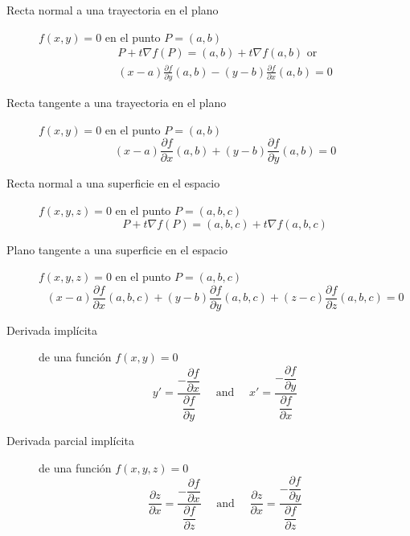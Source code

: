\begin{multicols}{2}
	\begin{tcolorbox}[hbox, title=Rectas tangente y normal en el plano]
		\begin{minipage}{0.4\textwidth}
			\flushleft
			\begin{description}
				\item[Recta normal a una trayectoria en el plano] $f(x,y)=0$ en el punto $P=(a,b)$
				\[
					\begin{array}{c}
						P+t\nabla f(P) = (a,b)+t\nabla f(a,b) \mbox{ or } \\
						(x-a)\frac{\partial f}{\partial y}(a,b)-(y-b)\frac{\partial f}{\partial x}(a,b)=0
					\end{array}      
				\]
				\item[Recta tangente a una trayectoria en el plano] $f(x,y)=0$ en el punto $P=(a,b)$
				\[
					(x-a)\frac{\partial f}{\partial x}(a,b)+(y-b)\frac{\partial f}{\partial y}(a,b)=0
				\]
			\end{description}
		\end{minipage}
  \end{tcolorbox}
  
  \begin{tcolorbox}[hbox, title=Recta normal y plano tangente en el espacio]
		\begin{minipage}{0.4\textwidth}
			\flushleft
			\begin{description}
				\item[Recta normal a una superficie en el espacio] $f(x,y,z)=0$ en el punto $P=(a,b,c)$
			  \[
				  P+t\nabla f(P) = (a,b,c)+t\nabla f(a,b,c)
				\]
				\item[Plano tangente a una superficie en el espacio] $f(x,y,z)=0$ en el punto $P=(a,b,c)$
				\[
					(x-a)\frac{\partial f}{\partial x}(a,b,c)+(y-b)\frac{\partial f}{\partial y}(a,b,c)+(z-c)\frac{\partial f}{\partial z}(a,b,c)=0
				\]
			\end{description}
		\end{minipage}
	\end{tcolorbox}

	\begin{tcolorbox}[hbox, title=Derivadas implícitas]
		\begin{minipage}{0.4\textwidth}
			\flushleft
			\begin{description}
				\item[Derivada implícita] de una función $f(x,y)=0$
				\[
					y' = \frac{-\dfrac{\partial f}{\partial x}}{\dfrac{\partial f}{\partial y}}
					\quad \mbox{ and } \quad
					x' = \frac{-\dfrac{\partial f}{\partial y}}{\dfrac{\partial f}{\partial x}}
				\]
				\item[Derivada parcial implícita] de una función $f(x,y,z)=0$
				\[
					\frac{\partial z}{\partial x} = \frac{-\dfrac{\partial f}{\partial x}}{\dfrac{\partial f}{\partial z}}
					\quad \mbox{ and } \quad
					\frac{\partial z}{\partial x} = \frac{-\dfrac{\partial f}{\partial y}}{\dfrac{\partial f}{\partial z}}
				\]
			\end{description}
		\end{minipage}
	\end{tcolorbox}


\end{multicols}
